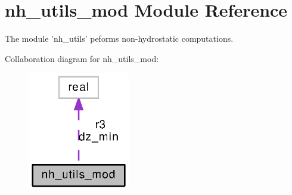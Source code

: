 \section{nh\-\_\-utils\-\_\-mod Module Reference}
\label{classnh__utils__mod}


The module 'nh\-\_\-utils' peforms non-\/hydrostatic computations.  




Collaboration diagram for nh\-\_\-utils\-\_\-mod\-:
\nopagebreak
\begin{figure}[H]
\begin{center}
\leavevmode
\includegraphics[width=126pt]{classnh__utils__mod__coll__graph}
\end{center}
\end{figure}
